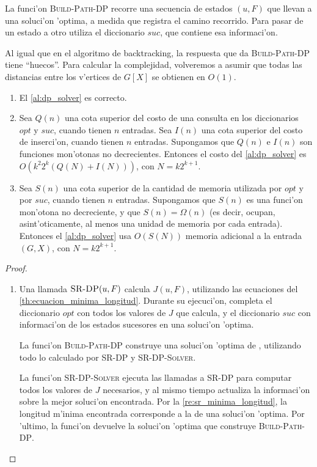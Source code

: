La funci'on \textsc{Build-Path-DP} recorre una secuencia de estados $(u, F)$ que llevan a una soluci'on 'optima, a medida que registra el camino recorrido. Para pasar de un estado a otro utiliza el diccionario $suc$, que contiene esa informaci'on.

Al igual que en el algoritmo de backtracking, la respuesta que da \textsc{Build-Path-DP} tiene ``huecos''. Para calcular la complejidad, volveremos a asumir que todas las distancias entre los v'ertices de $G[X]$ se obtienen en $O(1)$.

\begin{theorem}
\hfill
\begin{enumerate}
\item El \autoref{al:dp_solver} es correcto.
\item Sea $Q(n)$ una cota superior del costo de una consulta en los diccionarios $opt$ y $suc$, cuando tienen $n$ entradas. Sea $I(n)$ una cota superior del costo de inserci'on, cuando tienen $n$ entradas. Supongamos que $Q(n)$ e $I(n)$ son funciones mon'otonas no decrecientes. Entonces el costo del \autoref{al:dp_solver} es $O(k^2 2^k (Q(N) + I(N)))$, con $N = k 2^{k + 1}$.
\item Sea $S(n)$ una cota superior de la cantidad de memoria utilizada por $opt$ y por $suc$, cuando tienen $n$ entradas. Supongamos que $S(n)$ es una funci'on mon'otona no decreciente, y que $S(n) = \Omega(n)$ (es decir, ocupan, asint'oticamente, al menos una unidad de memoria por cada entrada). Entonces el \autoref{al:dp_solver} usa $O(S(N))$ memoria adicional a la entrada $(G, X)$, con $N = k 2^{k + 1}$.
\end{enumerate}

\begin{proof}
\hfill
\begin{enumerate}
\item Una llamada $\textsc{SR-DP}(u, F)$ calcula $J(u, F)$, utilizando las ecuaciones del \autoref{th:ecuacion_minima_longitud}. Durante su ejecuci'on, completa el diccionario $opt$ con todos los valores de $J$ que calcula, y el diccionario $suc$ con informaci'on de los estados sucesores en una soluci'on 'optima.

La funci'on \textsc{Build-Path-DP} construye una soluci'on 'optima de , utilizando todo lo calculado por \textsc{SR-DP} y \textsc{SR-DP-Solver}.

La funci'on \textsc{SR-DP-Solver} ejecuta las llamadas a \textsc{SR-DP} para computar todos los valores de $J$ necesarios, y al mismo tiempo actualiza la informaci'on sobre la mejor soluci'on encontrada. Por la \autoref{re:sr_minima_longitud}, la longitud m'inima encontrada corresponde a la de una soluci'on 'optima. Por 'ultimo, la funci'on devuelve la soluci'on 'optima que construye \textsc{Build-Path-DP}.


\end{enumerate}
\end{proof}
\end{theorem}
